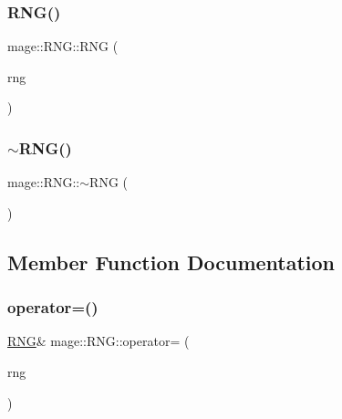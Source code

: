 \hypertarget{classmage_1_1_r_n_g_aea109c4ab1644a5294d7c2c1031a50c9}{}\label{classmage_1_1_r_n_g_aea109c4ab1644a5294d7c2c1031a50c9} 
\subsubsection{\texorpdfstring{R\+N\+G()}{RNG()}\hspace{0.1cm}{\footnotesize\ttfamily [3/3]}}
{\footnotesize\ttfamily mage\+::\+R\+N\+G\+::\+R\+NG (\begin{DoxyParamCaption}\item[{\hyperlink{classmage_1_1_r_n_g}{R\+NG} \&\&}]{rng }\end{DoxyParamCaption})\hspace{0.3cm}{\ttfamily [default]}}

\hypertarget{classmage_1_1_r_n_g_a20d24aabf31837e48a38b9ca221b0a9b}{}\label{classmage_1_1_r_n_g_a20d24aabf31837e48a38b9ca221b0a9b} 
\subsubsection{\texorpdfstring{$\sim$\+R\+N\+G()}{~RNG()}}
{\footnotesize\ttfamily mage\+::\+R\+N\+G\+::$\sim$\+R\+NG (\begin{DoxyParamCaption}{ }\end{DoxyParamCaption})\hspace{0.3cm}{\ttfamily [default]}}



\subsection{Member Function Documentation}
\hypertarget{classmage_1_1_r_n_g_a38a0a4296338162fe105012cb4d13318}{}\label{classmage_1_1_r_n_g_a38a0a4296338162fe105012cb4d13318} 
\subsubsection{\texorpdfstring{operator=()}{operator=()}\hspace{0.1cm}{\footnotesize\ttfamily [1/2]}}
{\footnotesize\ttfamily \hyperlink{classmage_1_1_r_n_g}{R\+NG}\& mage\+::\+R\+N\+G\+::operator= (\begin{DoxyParamCaption}\item[{const \hyperlink{classmage_1_1_r_n_g}{R\+NG} \&}]{rng }\end{DoxyParamCaption})\hspace{0.3cm}{\ttfamily [delete]}}

